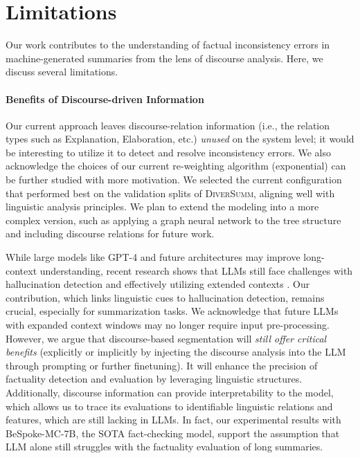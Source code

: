 \section*{Limitations}
Our work contributes to the understanding of factual inconsistency errors in machine-generated summaries from the lens of discourse analysis. 
Here, we discuss several limitations.

\paragraph{Benefits of Discourse-driven Information}
Our current approach leaves discourse-relation information (i.e., the relation types such as Explanation, Elaboration, etc.) \textit{unused} on the system level; it would be interesting to utilize it to detect and resolve inconsistency errors. We also acknowledge the choices of our current re-weighting algorithm (exponential) can be further studied with more motivation. We selected the current configuration that performed best on the validation splits of \textsc{DiverSumm}, aligning well with linguistic analysis principles. We plan to extend the modeling into a more complex version, such as applying a graph neural network to the tree structure and including discourse relations for future work.

While large models like GPT-4 and future architectures may improve long-context understanding, recent research shows that LLMs still face challenges with hallucination detection and effectively utilizing extended contexts \cite{liu-etal-2024-lost,zhu2024haluevalwildevaluatinghallucinationslanguage, luo2024halludiallargescalebenchmarkautomatic}. Our contribution, which links linguistic cues to hallucination detection, remains crucial, especially for summarization tasks. We acknowledge that future LLMs with expanded context windows may no longer require input pre-processing. However, we argue that discourse-based segmentation will \textit{still offer critical benefits} (explicitly or implicitly by injecting the discourse analysis into the LLM through prompting or further finetuning). It will enhance the precision of factuality detection and evaluation by leveraging linguistic structures. Additionally, discourse information can provide interpretability to the model, which allows us to trace its evaluations to identifiable linguistic relations and features, which are still lacking in LLMs. In fact, our experimental results with BeSpoke-MC-7B, the SOTA fact-checking model, support the assumption that LLM alone still struggles with the factuality evaluation of long summaries.


